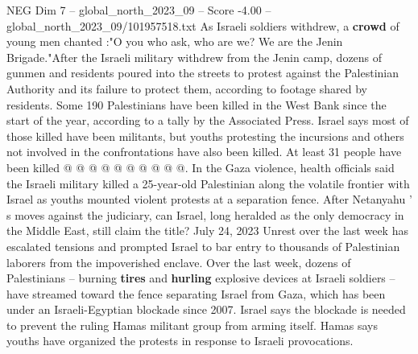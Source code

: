\begin{textsample}{NEG Dim 7 – global\_north\_2023\_09 – Score -4.00 – global\_north\_2023\_09/101957518.txt}
As Israeli soldiers withdrew, a \textbf{crowd} of young men chanted :"O you who ask, who are we?
We are the Jenin Brigade."After the Israeli military withdrew from the Jenin camp, dozens of gunmen and residents poured into the streets to protest against the Palestinian Authority and its failure to protect them, according to footage shared by residents.
Some 190 Palestinians have been killed in the West Bank since the start of the year, according to a tally by the Associated Press.
Israel says most of those killed have been militants, but youths protesting the incursions and others not involved in the confrontations have also been killed.
At least 31 people have been killed @ @ @ @ @ @ @ @ @ @.
In the Gaza violence, health officials said the Israeli military killed a 25-year-old Palestinian along the volatile frontier with Israel as youths mounted violent protests at a separation fence.
After Netanyahu ' s moves against the judiciary, can Israel, long heralded as the only democracy in the Middle East, still claim the title?
July 24, 2023 Unrest over the last week has escalated tensions and prompted Israel to bar entry to thousands of Palestinian laborers from the impoverished enclave.
Over the last week, dozens of Palestinians -- burning \textbf{tires} and \textbf{hurling} explosive devices at Israeli soldiers -- have streamed toward the fence separating Israel from Gaza, which has been under an Israeli-Egyptian blockade since 2007.
Israel says the blockade is needed to prevent the ruling Hamas militant group from arming itself.
Hamas says youths have organized the protests in response to Israeli provocations.

\end{textsample}

